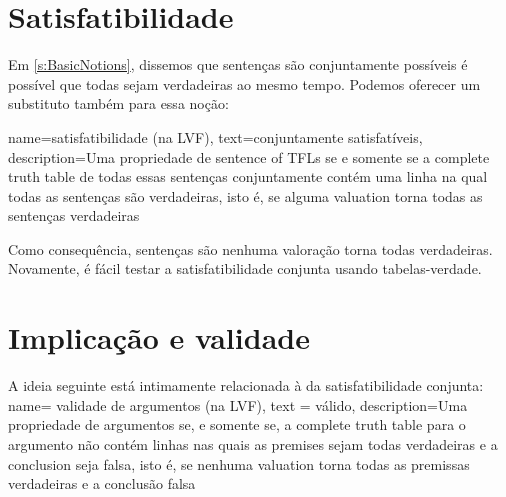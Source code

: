 \section{Satisfatibilidade}
Em \cref{s:BasicNotions}, dissemos que sentenças são conjuntamente possíveis \ifeff{} é possível que todas sejam verdadeiras ao mesmo tempo. Podemos oferecer um substituto também para essa noção:

{
  name=satisfatibilidade (na LVF),
  text=conjuntamente satisfatíveis,
  description={Uma propriedade de \glspl{sentence of TFL} se e somente se a
  \gls{complete truth table} de todas essas sentenças conjuntamente contém uma linha
  na qual todas as sentenças são verdadeiras, isto é, se alguma \gls{valuation}
  torna todas as sentenças verdadeiras}
}

Como consequência, sentenças são  \ifeff{} nenhuma valoração torna todas verdadeiras. Novamente, é fácil testar a satisfatibilidade conjunta usando tabelas-verdade.

\section{Implicação e validade}
A ideia seguinte está intimamente relacionada à da satisfatibilidade conjunta:
{
  name= validade de argumentos (na LVF),
  text = válido,
description={Uma propriedade de argumentos se, e somente se, a \gls{complete truth table} para o argumento não contém linhas nas quais as \glspl{premise} sejam todas verdadeiras e a \gls{conclusion} seja falsa, isto é, se nenhuma \gls{valuation} torna todas as premissas verdadeiras e a conclusão falsa}
}
 
